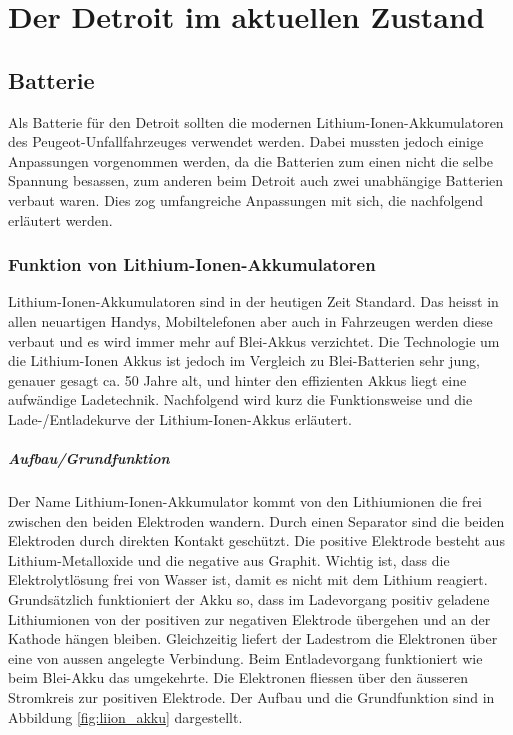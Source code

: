 \chapter{Der Detroit im aktuellen Zustand}

\section{Batterie}
Als Batterie für den Detroit sollten die modernen Lithium-Ionen-Akkumulatoren des Peugeot-Unfallfahrzeuges verwendet werden. Dabei mussten jedoch einige Anpassungen vorgenommen werden, da die Batterien zum einen nicht die selbe Spannung besassen, zum anderen beim Detroit auch zwei unabhängige Batterien verbaut waren. Dies zog umfangreiche Anpassungen mit sich, die nachfolgend erläutert werden.

\subsection{Funktion von Lithium-Ionen-Akkumulatoren} \label{kap_liion}

Lithium-Ionen-Akkumulatoren sind in der heutigen Zeit Standard. Das heisst in allen neuartigen Handys, Mobiltelefonen aber auch in Fahrzeugen werden diese verbaut und es wird immer mehr auf Blei-Akkus verzichtet. Die Technologie um die Lithium-Ionen Akkus ist jedoch im Vergleich zu Blei-Batterien sehr jung, genauer gesagt ca. 50 Jahre alt, und hinter den effizienten Akkus liegt eine aufwändige Ladetechnik. Nachfolgend wird kurz die Funktionsweise und die Lade-/Entladekurve der Lithium-Ionen-Akkus erläutert.

\paragraph{Aufbau/Grundfunktion}

Der Name Lithium-Ionen-Akkumulator kommt von den Lithiumionen die frei zwischen den beiden Elektroden wandern. Durch einen Separator sind die beiden Elektroden durch direkten Kontakt geschützt. Die positive Elektrode besteht aus Lithium-Metalloxide und die negative aus Graphit. Wichtig ist, dass die Elektrolytlösung frei von Wasser ist, damit es nicht mit dem Lithium reagiert.
Grundsätzlich funktioniert der Akku so, dass im Ladevorgang positiv geladene Lithiumionen von der positiven zur negativen Elektrode übergehen und an der Kathode hängen bleiben. Gleichzeitig liefert der Ladestrom die Elektronen über eine von aussen angelegte Verbindung. Beim Entladevorgang funktioniert wie beim Blei-Akku das umgekehrte. Die Elektronen fliessen über den äusseren Stromkreis zur positiven Elektrode. Der Aufbau und die Grundfunktion sind in Abbildung \ref{fig:liion_akku} dargestellt. \cite{liion_akku_aufbau_funktion2}

